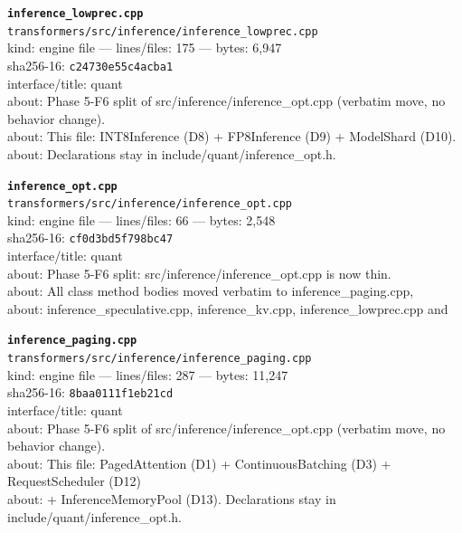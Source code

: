 \noindent\textbf{\texttt{inference\_lowprec.cpp}}\\
\texttt{transformers/src/inference/inference\_lowprec.cpp}\\
kind: engine file --- lines/files: 175 --- bytes: 6,947\\
sha256-16: \texttt{c24730e55c4acba1}\\
interface/title: quant\\
about: Phase 5-F6 split of src/inference/inference\_opt.cpp (verbatim move, no behavior change).\\
about: This file: INT8Inference (D8) + FP8Inference (D9) + ModelShard (D10).\\
about: Declarations stay in include/quant/inference\_opt.h.\\
\vspace*{6.0pt}

\noindent\textbf{\texttt{inference\_opt.cpp}}\\
\texttt{transformers/src/inference/inference\_opt.cpp}\\
kind: engine file --- lines/files: 66 --- bytes: 2,548\\
sha256-16: \texttt{cf0d3bd5f798bc47}\\
interface/title: quant\\
about: Phase 5-F6 split: src/inference/inference\_opt.cpp is now thin.\\
about: All class method bodies moved verbatim to inference\_paging.cpp,\\
about: inference\_speculative.cpp, inference\_kv.cpp, inference\_lowprec.cpp and\\
\vspace*{6.0pt}

\noindent\textbf{\texttt{inference\_paging.cpp}}\\
\texttt{transformers/src/inference/inference\_paging.cpp}\\
kind: engine file --- lines/files: 287 --- bytes: 11,247\\
sha256-16: \texttt{8baa0111f1eb21cd}\\
interface/title: quant\\
about: Phase 5-F6 split of src/inference/inference\_opt.cpp (verbatim move, no behavior change).\\
about: This file: PagedAttention (D1) + ContinuousBatching (D3) + RequestScheduler (D12)\\
about: + InferenceMemoryPool (D13). Declarations stay in include/quant/inference\_opt.h.\\
\vspace*{6.0pt}

